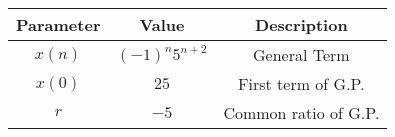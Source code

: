 \begin{tabular}{|c|c|c|}
    \hline
     \textbf{Parameter} & \textbf{Value} &
     \textbf{Description}\\
    \hline 
     $x(n)$ &  $(-1)^{n}5^{n+2}$ & General Term\\
    \hline 
     $x(0)$ &  $25$ & First term of G.P.\\
     
    \hline
     $r$ & $-5$ & Common ratio of G.P.  \\
      \hline
    
  
								      
\end{tabular}
